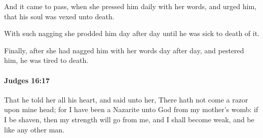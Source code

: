 			\begin{versebox}
					\item[BHS] 
					\item[ASV] And it came to pass, when she pressed him daily with her words, and urged him, that his soul was vexed unto death.
					\item[NIV] With such nagging she prodded him day after day until he was sick to death of it.
					\item[NRSV] Finally, after she had nagged him with her words day after day, and pestered him, he was tired to death.
			\end{versebox}

		\paragraph{Judges 16:17} %
			\label{JUDGES-16-17}

			That he told her all his heart, and said unto her, There hath not come a razor upon mine head; for I have been a Nazarite unto God from my mother’s womb: if I be shaven, then my strength will go from me, and I shall become weak, and be like any other man.

